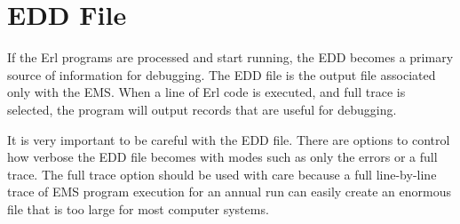 \section{EDD File}\label{edd-file}

If the Erl programs are processed and start running, the EDD becomes a primary source of information for debugging. The EDD file is the output file associated only with the EMS. When a line of Erl code is executed, and full trace is selected, the program will output records that are useful for debugging.

It is very important to be careful with the EDD file. There are options to control how verbose the EDD file becomes with modes such as only the errors or a full trace. The full trace option should be used with care because a full line-by-line trace of EMS program execution for an annual run can easily create an enormous file that is too large for most computer systems.
